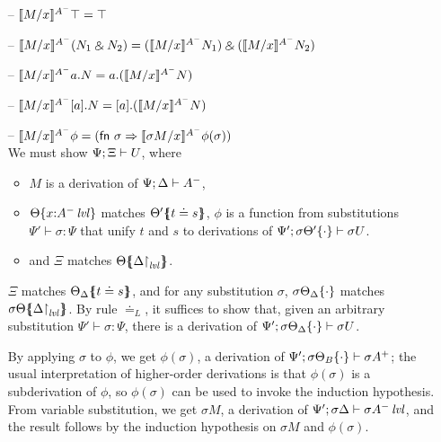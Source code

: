 \begin{itemize}
\smallskip

\item[--] $\rsubsta{M}{x}{\ttopr}{A^-} 
           = \ttopr$
\item[--] $\rsubsta{M}{x}{(\twithr{N_1}{N_2})}{A^-} 
           = \twithr{(\rsubsta{M}{x}{N_1}{A^-})}{(\rsubsta{M}{x}{N_2}{A^-})}$

\item[--] $\rsubsta{M}{x}{\texistsl{a}{N}}{A^-} 
           = \texistsl{a}{(\rsubsta{M}{x}{N}{A^-})}$
\item[--] $\rsubsta{M}{x}{\tforallr{a}{N}}{A^-} 
           = \tforallr{a}{(\rsubsta{M}{x}{N}{A^-})}$
\item[--] $\rsubsta{M}{x}{\phi}{A^-} 
           = ({\sf fn}~\sigma \Rightarrow 
              \rsubsta{\sigma{M}}{x}{\phi(\sigma)}{A^-})$\smallskip\\
  We must show $\foc{\Psi}{\Xi}{U}$, where
  \begin{itemize}
  \item $M$ is a derivation of $\foc{\Psi}{\Delta}{A^-}$, 
  \item $\tackon{\Theta}{x{:}\islvl{A^-}}$ matches 
     $\frameoff{\Theta'}{t \doteq s}$, $\phi$ 
     is a function from substitutions $\Psi' \vdash \sigma : \Psi$
     that unify $t$ and $s$ to derivations of 
     $\foc{\Psi'}{\tackon{\sigma\Theta'}{\cdot}}{\sigma{U}}$.
  \item and $\Xi$ matches $\frameoff{\Theta}{\restrictto{\Delta}{\mlvl}}$.
  \end{itemize}

  $\Xi$ matches $\frameoff{\Theta_\Delta}{t \doteq s}$, and 
  for any substitution $\sigma$, $\tackon{\sigma\Theta_\Delta}{\cdot}$
  matches $\frameoff{\sigma\Theta}{\restrictto{\Delta}{\mlvl}}$.
  By rule $\doteq_L$, it suffices to show that, given an arbitrary
  substitution $\Psi' \vdash \sigma : \Psi$, there
  is a derivation of 
  $\foc{\Psi'}{\tackon{\sigma\Theta_\Delta}{\cdot}}{\sigma{U}}$.

  By applying $\sigma$ to $\phi$, we get $\phi(\sigma)$, a derivation 
  of $\foc{\Psi'}{\tackon{\sigma\Theta_B}{\cdot}}{\sigma{A^+}}$;
  the usual interpretation of higher-order derivations is that 
  $\phi(\sigma)$ is a subderivation of $\phi$, so $\phi(\sigma)$ can be
  used to invoke the induction hypothesis.
  From variable substitution, we get $\sigma{M}$, a derivation
  of 
  $\foc{\Psi'}{\sigma\Delta}{\islvl{\sigma{A^-}}}$,
  and the result follows
  by the induction hypothesis on $\sigma{M}$ and 
  $\phi(\sigma)$.

\end{itemize}

